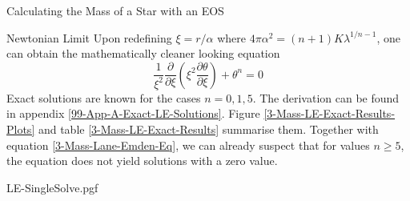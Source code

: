 \begin{section}{Calculating the Mass of a Star with an EOS}
\begin{subsection}{Newtonian Limit}
Upon redefining $\xi=r/\alpha$ where $4\pi\alpha^2=(n+1)K\lambda^{1/n-1}$, one can obtain the mathematically cleaner looking equation
\begin{equation}
	\frac{1}{\xi^2}\frac{\partial}{\partial\xi}\left(\xi^2\frac{\partial\theta}{\partial\xi}\right) + \theta^n=0 \label{3-Mass-Lane-Emden-Eq}
\end{equation}
Exact solutions are known for the cases $n=0,1,5$. The derivation can be found in appendix \ref{99-App-A-Exact-LE-Solutions}. Figure \ref{3-Mass-LE-Exact-Results-Plots} and table \ref{3-Mass-LE-Exact-Results} summarise them. Together with equation \eqref{3-Mass-Lane-Emden-Eq}, we can already suspect that for values $n\geq5$, the equation does not yield solutions with a zero value.\\
\noindent
\begin{minipage}{0.5\textwidth}
	\centering
	{LE-SingleSolve.pgf}
\end{minipage}\hfill%
\begin{minipage}{0.45\textwidth}
	\renewcommand{\arraystretch}{1.2}
	\begin{tabular}[b]{@{}lcccc@{}}

\end{tabular}
\end{minipage}
\end{subsection}
\end{section}
